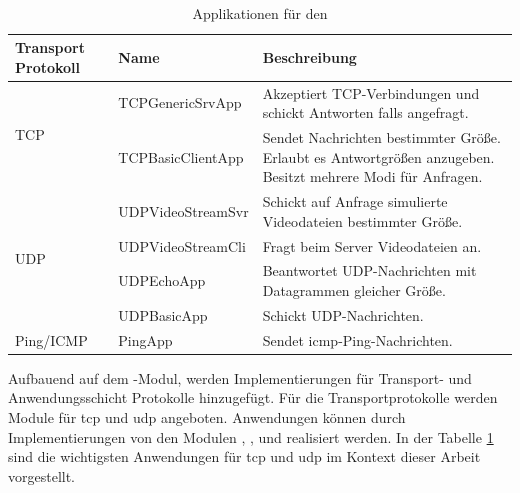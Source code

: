 \paragraph{}
\begin{table}[ht]
	\centering
	\begin{tabularx}{\textwidth}{|l|l|X|}
		\hline
		\rowcolor{Gainsboro!60}
		\textbf{Transport Protokoll} & \textbf{Name}     & \textbf{Beschreibung}                                                                                        \\ \hline
		\multirow{2}{*}{TCP}         & TCPGenericSrvApp  & Akzeptiert TCP-Verbindungen und schickt Antworten falls angefragt.                                           \\ \cline{2-3}
		                             & TCPBasicClientApp & Sendet Nachrichten bestimmter Größe. Erlaubt es Antwortgrößen anzugeben. Besitzt mehrere Modi für Anfragen. \\ \hline
		\multirow{4}{*}{UDP}         & UDPVideoStreamSvr & Schickt auf Anfrage simulierte Videodateien bestimmter Größe.                                                \\ \cline{2-3}
		                             & UDPVideoStreamCli & Fragt beim Server Videodateien an.                                                                           \\ \cline{2-3}
		                             & UDPEchoApp        & Beantwortet UDP-Nachrichten mit Datagrammen gleicher Größe.                                                       \\ \cline{2-3}
		                             & UDPBasicApp       & Schickt UDP-Nachrichten.                                                                                     \\ \hline
		Ping/ICMP                    & PingApp           & Sendet \gls{icmp}-Ping-Nachrichten.                                                                          \\ \hline
	\end{tabularx}
	\caption[Kurzbeschreibung Anwendungen]{Applikationen für den } 
	\label{tab:nedApps}
\end{table}
Aufbauend auf dem -Modul, werden Implementierungen für Transport- und Anwendungsschicht Protokolle hinzugefügt. Für die Transportprotokolle werden Module für \gls{tcp} und \gls{udp} angeboten. Anwendungen können durch Implementierungen von den Modulen , ,  und  realisiert werden. In der Tabelle \ref{tab:nedApps} sind die wichtigsten Anwendungen für \gls{tcp} und \gls{udp} im Kontext dieser Arbeit vorgestellt.


